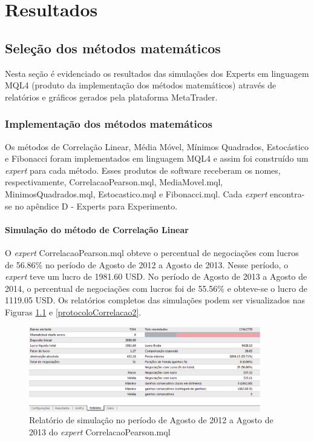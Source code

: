 \chapter{Resultados}


\section{Seleção dos métodos matemáticos}

Nesta seção é evidenciado os resultados  das simulações dos Experts em linguagem MQL4 (produto da implementação dos métodos matemáticos) através de relatórios e gráficos gerados pela plataforma MetaTrader.

\subsection{Implementação dos métodos matemáticos}

Os métodos de Correlação Linear, Média Móvel, Mínimos Quadrados, Estocástico e Fibonacci foram implementados em linguagem MQL4 e assim foi construído um \textit{expert} para cada método. Esses produtos de software receberam os nomes, respectivamente, CorrelacaoPearson.mql, MediaMovel.mql, MinimosQuadrados.mql, Estocastico.mql e Fibonacci.mql. Cada \textit{expert} encontra-se no apêndice D - Experts para Experimento.

\subsubsection{Simulação do método de Correlação Linear}

O \textit{expert} CorrelacaoPearson.mql obteve o percentual de negociações com lucros de 56.86\% no período de Agosto de 2012 a Agosto de 2013. Nesse período, o \textit{expert} teve um lucro de 1981.60 USD. No período de Agosto de 2013 a Agosto de 2014, o percentual de negociações com lucros foi de 55.56\%  e obteve-se o lucro de 1119.05 USD. 
Os relatórios completos das simulações podem ser visualizados nas Figuras \ref{protocoloCorrelacao} e \ref{protocoloCorrelacao2}.

\begin{figure}[H]
\centering
\includegraphics[width=0.9\textwidth]{figuras/protocoloCorrelacao}
\caption{Relatório de simulação no período de Agosto de 2012 a Agosto de 2013 do \textit{expert} CorrelacaoPearson.mql}
\label{protocoloCorrelacao}
\end{figure}

